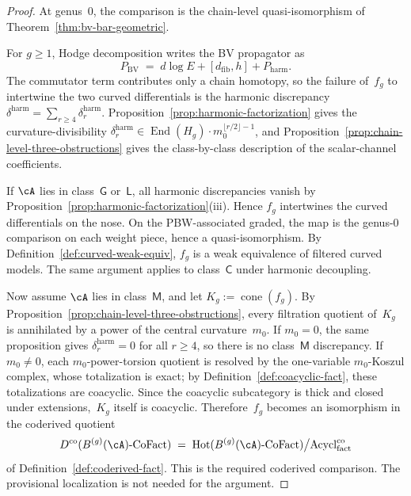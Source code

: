 \begin{proof}
At genus~$0$, the comparison is the chain-level quasi-isomorphism
of Theorem~\ref{thm:bv-bar-geometric}.

For $g \geq 1$, Hodge decomposition writes the BV propagator as
\[
P_{\mathrm{BV}}
\;=\;
d\log E + [d_{\mathrm{fib}}, h] + P_{\mathrm{harm}}.
\]
The commutator term contributes only a chain homotopy, so the
failure of~$f_g$ to intertwine the two curved differentials is the
harmonic discrepancy
$\delta^{\mathrm{harm}} = \sum_{r \geq 4}\delta_r^{\mathrm{harm}}$.
Proposition~\ref{prop:harmonic-factorization} gives the
curvature-divisibility
$\delta_r^{\mathrm{harm}} \in \operatorname{End}(H_g)\cdot
m_0^{\lfloor r/2 \rfloor - 1}$, and
Proposition~\ref{prop:chain-level-three-obstructions} gives the
class-by-class description of the scalar-channel coefficients.

If $\cA$ lies in class~$\mathsf{G}$ or~$\mathsf{L}$, all harmonic
discrepancies vanish by
Proposition~\ref{prop:harmonic-factorization}(iii).
Hence $f_g$ intertwines the curved
differentials on the nose. On the PBW-associated graded, the map is
the genus-$0$ comparison on each weight piece, hence a
quasi-isomorphism. By Definition~\ref{def:curved-weak-equiv}, $f_g$
is a weak equivalence of filtered curved models. The same argument
applies to class~$\mathsf{C}$ under harmonic decoupling.

Now assume $\cA$ lies in class~$\mathsf{M}$, and let
$K_g := \operatorname{cone}(f_g)$. By
Proposition~\ref{prop:chain-level-three-obstructions}, every
filtration quotient of~$K_g$ is annihilated by a power of the
central curvature~$m_0$. If $m_0 = 0$, the same proposition gives
$\delta_r^{\mathrm{harm}} = 0$ for all $r \geq 4$, so there is no
class~$\mathsf{M}$ discrepancy. If $m_0 \neq 0$, each
$m_0$-power-torsion quotient is resolved by the one-variable
$m_0$-Koszul complex, whose totalization is exact; by
Definition~\ref{def:coacyclic-fact}, these totalizations are
coacyclic. Since the coacyclic subcategory is thick and closed
under extensions,~$K_g$ itself is coacyclic. Therefore~$f_g$
becomes an isomorphism in the coderived quotient
\[
D^{\mathrm{co}}(B^{(g)}(\cA)\text{-}\mathrm{CoFact})
\;=\;
\mathrm{Hot}(B^{(g)}(\cA)\text{-}\mathrm{CoFact})
\big/\mathrm{Acycl}^{\mathrm{co}}_{\mathrm{fact}}
\]
of Definition~\ref{def:coderived-fact}. This is the required
coderived comparison. The provisional localization is not needed
for the argument.
\end{proof}

